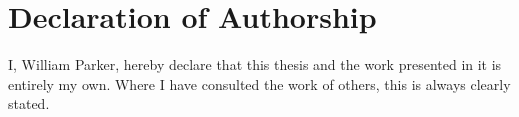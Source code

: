 \chapter*{Declaration of Authorship}

I, William Parker, hereby declare that this thesis and the work presented in it is entirely my own. Where I have consulted the work of others, this is always clearly stated.

\newpage